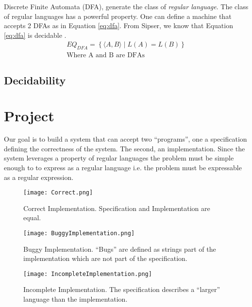 \documentclass[12pt,journal,compsoc]{IEEEtran}
\begin{document}
Discrete Finite Automata (DFA), generate the class of \emph{regular language}.  
The class of regular languages has a powerful property. One can define a machine
that accepts 2 DFAs as in Equation \ref{eq:dfa}. From Sipser, we know that
Equation \ref{eq:dfa} is decidable \cite[p.~169]{Sipser}.
\begin{multline}
    EQ_{DFA} = \left\{ \langle A, B \rangle  \mid  L( A ) = L( B ) \right\} \\
    \text{Where A and B are DFAs}
    \label{eq:dfa}
\end{multline}

\subsection{Decidability}

\section{Project}
Our goal is to build a system that can accept two ``programs'', one
a specification defining the correctness of the system. The second, an
implementation. Since the system leverages a property of regular languages the
problem must be simple enough to to express as a regular language i.e. the
problem must be expressable as a regular expression. 

\begin{figure*}[!t]
    \begin{center}
        \texttt{[image: Correct.png]}
        \label{fig:correct}
        \caption{Correct Implementation. Specification and Implementation are
        equal.}
    \end{center}
\end{figure*}

\begin{figure*}[!t]
    \centering
        \texttt{[image: BuggyImplementation.png]}
        \label{fig:buggy}
        \caption{Buggy Implementation. ``Bugs'' are defined as strings part of
        the implementation which are not part of the specification.}
\end{figure*}

\begin{figure*}[!t]
    \begin{center}
        \texttt{[image: IncompleteImplementation.png]}
        \label{fig:incomplete}
        \caption{Incomplete Implementation. The specification describes
        a ``larger'' language than the implementation.}
    \end{center}
\end{figure*}
\end{document}
